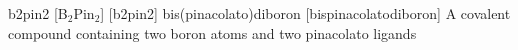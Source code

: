 \newglsXchemical%
{b2pin2}%
[B$_2$Pin$_2$]%
[b2pin2]%
{bis(pinacolato)diboron}%
{}%
[bispinacolatodiboron]%
{A covalent compound containing two boron atoms and two pinacolato ligands}%